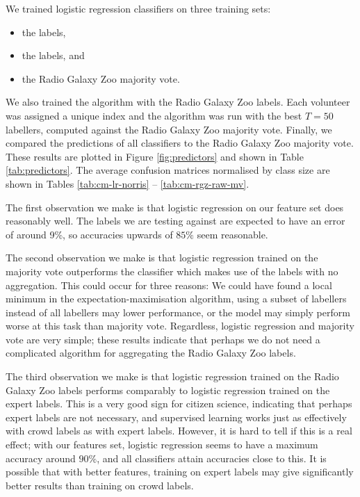     We trained logistic regression classifiers on three training sets:
    \begin{itemize}
      \item the \citeauthor{norris06} labels,
      \item the \citeauthor{fan15} labels, and
      \item the Radio Galaxy Zoo majority vote.
    \end{itemize}
    We also trained the \citeauthor{raykar10} algorithm with the Radio Galaxy
    Zoo labels. Each volunteer was assigned a unique index and the algorithm was
    run with the best $T = 50$ labellers, computed against the Radio Galaxy Zoo
    majority vote. Finally, we compared the predictions of all classifiers to
    the Radio Galaxy Zoo majority vote. These results are plotted in Figure
    \ref{fig:predictors} and shown in Table \ref{tab:predictors}. The average
    confusion matrices normalised by class size are shown in Tables
    \ref{tab:cm-lr-norris} -- \ref{tab:cm-rgz-raw-mv}.

    The first observation we make is that logistic regression on our feature set
    does reasonably well. The \citeauthor{norris06} labels we are testing
    against are expected to have an error of around 9\%, so accuracies upwards
    of $85\%$ seem reasonable.

    The second observation we make is that logistic regression trained on the
    majority vote outperforms the \citeauthor{raykar10} classifier which makes
    use of the labels with no aggregation. This could occur for three reasons:
    We could have found a local minimum in the expectation-maximisation
    algorithm, using a subset of labellers instead of all labellers may lower
    performance, or the \citeauthor{raykar10} model may simply perform worse at
    this task than majority vote. Regardless, logistic regression and majority
    vote are very simple; these results indicate that perhaps we do not need a
    complicated algorithm for aggregating the Radio Galaxy Zoo labels.

    The third observation we make is that logistic regression trained on the
    Radio Galaxy Zoo labels performs comparably to logistic regression trained
    on the expert labels. This is a very good sign for citizen science,
    indicating that perhaps expert labels are not necessary, and supervised
    learning works just as effectively with crowd labels as with expert labels.
    However, it is hard to tell if this is a real effect; with our features set,
    logistic regression seems to have a maximum accuracy around $90\%$, and all
    classifiers attain accuracies close to this. It is possible that with better
    features, training on expert labels may give significantly better results
    than training on crowd labels.

